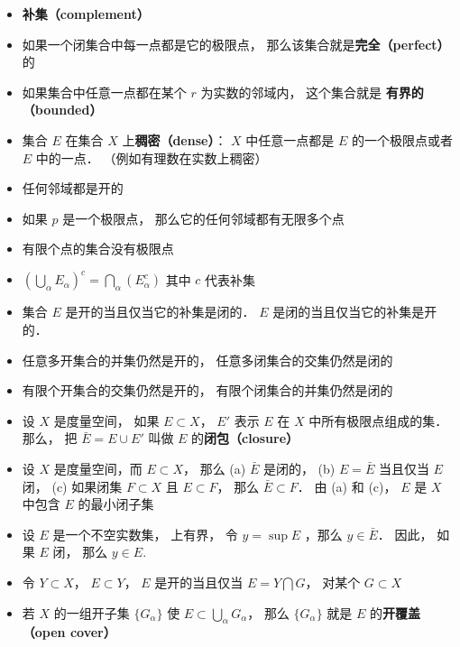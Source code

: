 \begin{itemize}
\item \textbf{补集（complement）}

\item 如果一个闭集合中每一点都是它的极限点， 那么该集合就是\textbf{完全（perfect）} 的

\item 如果集合中任意一点都在某个 $r$ 为实数的邻域内， 这个集合就是 \textbf{有界的（bounded）}

\item 集合 $E$ 在集合 $X$ 上\textbf{稠密（dense）}： $X$ 中任意一点都是 $E$ 的一个极限点或者 $E$ 中的一点． （例如有理数在实数上稠密）

\item 任何邻域都是开的

\item 如果 $p$ 是一个极限点， 那么它的任何邻域都有无限多个点

\item 有限个点的集合没有极限点

\item $(\bigcup_\alpha E_\alpha)^c = \bigcap_\alpha (E_\alpha^c)$ 其中 $c$ 代表补集

\item 集合 $E$ 是开的当且仅当它的补集是闭的． $E$ 是闭的当且仅当它的补集是开的．

\item 任意多开集合的并集仍然是开的， 任意多闭集合的交集仍然是闭的

\item 有限个开集合的交集仍然是开的， 有限个闭集合的并集仍然是闭的

\item 设 $X$ 是度量空间， 如果 $E \subset X$， $E'$ 表示 $E$ 在 $X$ 中所有极限点组成的集． 那么， 把 $\bar E = E \cup E'$ 叫做 $E$ 的\textbf{闭包（closure）}

\item 设 $X$ 是度量空间，而 $E \subset X$， 那么 (a) $\bar E$ 是闭的， (b) $E = \bar E$ 当且仅当 $E$ 闭， (c) 如果闭集 $F \subset X$ 且 $E \subset F$， 那么 $\bar E \subset F$． 由 (a) 和 (c)， $E$ 是 $X$ 中包含 $E$ 的最小闭子集

\item 设 $E$ 是一个不空实数集， 上有界， 令 $y = \sup E$ ，那么 $y \in \bar E$．
因此， 如果 $E$ 闭， 那么 $y \in E$.

\item 令 $Y \subset X$， $E \subset Y$， $E$ 是开的当且仅当 $E = Y \bigcap G$， 对某个 $G \subset X$

\item 若 $X$ 的一组开子集 $\{G_\alpha\}$ 使 $E \subset \bigcup_\alpha G_\alpha$， 那么 $\{G_\alpha\}$ 就是 $E$ 的\textbf{开覆盖（open cover）}


\end{itemize}
